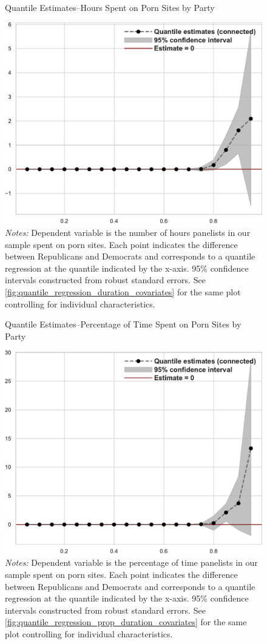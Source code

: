 \documentclass[12pt, letterpaper]{article}
\begin{document}
\begin{figure}[ht]
\centering
\caption{Quantile Estimates--Hours Spent on Porn Sites by Party}
\includegraphics[width=.6\linewidth]{../figs/quantile_reg_duration_adult.pdf}
	\caption*{\footnotesize \emph{Notes:} 
		Dependent variable is the number of hours panelists in our sample spent on porn sites.
		Each point indicates the difference between Republicans and Democrats and corresponds to a quantile regression at the quantile indicated by the x-axis.
		95\% confidence intervals constructed from robust standard errors.
		See \cref{fig:quantile_regression_duration_covariates} for the same plot controlling for individual characteristics.
}
\label{fig:quantile_regression_duration}
\end{figure}

\begin{figure}[ht]
	\centering
	\caption{Quantile Estimates--Percentage of Time Spent on Porn Sites by Party}
	\includegraphics[width=.6\linewidth]{../figs/quantile_reg_proportion_duration_adult.pdf}
	\caption*{\footnotesize \emph{Notes:} 
		Dependent variable is the percentage of time panelists in our sample spent on porn sites.
		Each point indicates the difference between Republicans and Democrats and corresponds to a quantile regression at the quantile indicated by the x-axis.
		95\% confidence intervals constructed from robust standard errors.
		See \cref{fig:quantile_regression_prop_duration_covariates} for the same plot controlling for individual characteristics.
	}
	\label{fig:quantile_regression_prop_duration}
\end{figure}
\end{document}
